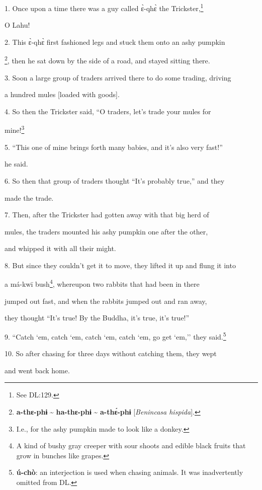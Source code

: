 \setcounter{footnote}{0}

1. Once upon a time there was a guy called ɛ̀-qhɛ̀ the Trickster,\footnote{See DL:129.}

O Lahu!

2. This ɛ̀-qhɛ̀ first fashioned legs and stuck them onto an ashy pumpkin


\footnote{\textbf{a-thɛ-phɨ} \textasciitilde{} \textbf{ha-thɛ-phɨ} \textasciitilde{} \textbf{a-thɛ́-phɨ} [\textit{Benincasa hispida}].}, then he sat down by the side of a road, and stayed sitting there.

3. Soon a large group of traders arrived there to do some trading, driving

a hundred mules [loaded with goods].

4. So then the Trickster said, ``O traders, let's trade your mules for

mine!\footnote{I.e., for the ashy pumpkin made to look like a donkey.}

5. ``This one of mine brings forth many babies, and it's also very fast!''

he said.

6. So then that group of traders thought ``It's probably true,'' and they

made the trade.

7. Then, after the Trickster had gotten away with that big herd of

mules, the traders mounted his ashy pumpkin one after the other,

and whipped it with all their might.

8. But since they couldn't get it to move, they lifted it up and flung it into


a má-kwī bush\footnote{A kind of bushy gray creeper with sour shoots and edible black fruits that grow in bunches like grapes.}, whereupon two rabbits that had been in there

jumped out fast, and when the rabbits jumped out and ran away,

they thought ``It's true! By the Buddha, it's true, it's true!''

9. ``Catch `em, catch `em, catch `em, catch `em, go get `em,'' they said.\footnote{\textbf{ú-chò}: an interjection is used when chasing animals. It was inadvertently omitted from DL.}

10. So after chasing for three days without catching them, they wept

and went back home.

